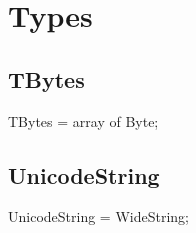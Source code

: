 \documentclass{report}
\newif\ifpdf
\begin{document}
\section{Types}
\ifpdf
\subsection*{\large{\textbf{TBytes}}\normalsize\hspace{1ex}\hrulefill}
\else
\subsection*{TBytes}
\fi
\label{PasDoc_Types-TBytes}
\begin{list}{}{
\setlength{\itemindent}{0cm}
\setlength{\listparindent}{0cm}
\setlength{\leftmargin}{\evensidemargin}
\addtolength{\leftmargin}{\tmplength}
\settowidth{\labelsep}{X}
\addtolength{\leftmargin}{\labelsep}
\setlength{\labelwidth}{\tmplength}
}
\item[\textbf{Declaration}\hfill]
\ifpdf
\begin{flushleft}
\fi
\begin{ttfamily}
TBytes = array of Byte;\end{ttfamily}

\ifpdf
\end{flushleft}
\fi

\end{list}
\ifpdf
\subsection*{\large{\textbf{UnicodeString}}\normalsize\hspace{1ex}\hrulefill}
\else
\subsection*{UnicodeString}
\fi
\label{PasDoc_Types-UnicodeString}
\begin{list}{}{
\setlength{\itemindent}{0cm}
\setlength{\listparindent}{0cm}
\setlength{\leftmargin}{\evensidemargin}
\addtolength{\leftmargin}{\tmplength}
\settowidth{\labelsep}{X}
\addtolength{\leftmargin}{\labelsep}
\setlength{\labelwidth}{\tmplength}
}
\item[\textbf{Declaration}\hfill]
\ifpdf
\begin{flushleft}
\fi
\begin{ttfamily}
UnicodeString = WideString;\end{ttfamily}

\ifpdf
\end{flushleft}
\fi

\end{list}
\ifpdf
\end{document}
